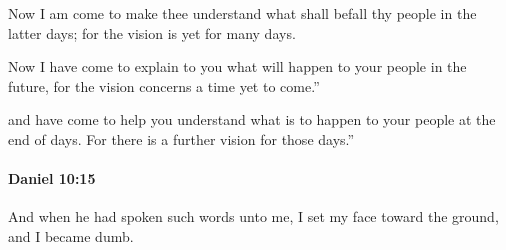 			\begin{versebox}
					\item[BHS] 
					\item[LXX] 
					\item[ASV] Now I am come to make thee understand what shall befall thy people in the latter days; for the vision is yet for many days.
					\item[NIV] Now I have come to explain to you what will happen to your people in the future, for the vision concerns a time yet to come.”
					\item[NRSV] and have come to help you understand what is to happen to your people at the end of days. For there is a further vision for those days.”
			\end{versebox}

		\paragraph{Daniel 10:15} %
			\label{DANIEL-10-15}

			And when he had spoken such words unto me, I set my face toward the ground, and I became dumb.

